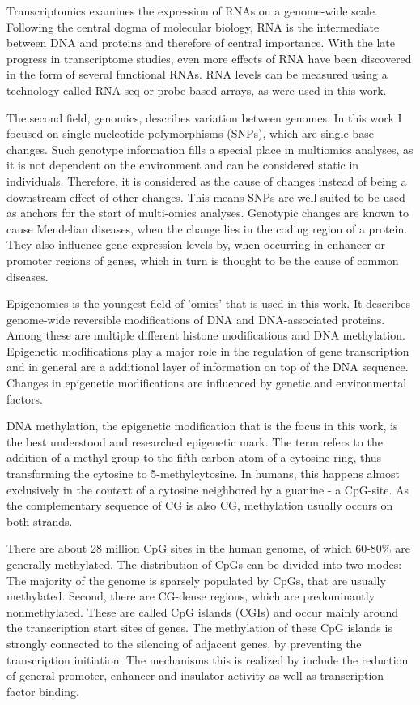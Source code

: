 \documentclass[a4paper,12pt,twoside,openright]{article}
\begin{document}
Transcriptomics examines the expression of RNAs on a genome-wide scale. Following the central dogma of molecular biology, RNA is the intermediate between DNA and proteins and therefore of central importance\cite{CRICK1970}. With the late progress in transcriptome studies, even more effects of RNA have been discovered in the form of several functional RNAs\cite{10.3389/fgene.2015.00002}. RNA levels can be measured using a technology called RNA-seq\cite{Wang2009} or probe-based arrays\cite{Schulze2001}, as were used in this work. 

The second field, genomics, describes variation between genomes. In this work I focused on single nucleotide polymorphisms (SNPs), which are single base changes.
Such genotype information fills a special place in multiomics analyses, as it is not dependent on the environment and can be considered static in individuals. Therefore, it is considered as the cause of changes instead of being a downstream effect of other changes\cite{Hasin2017}. This means SNPs are well suited to be used as anchors for the start of multi-omics analyses. 
Genotypic changes are known to cause Mendelian diseases, when the change lies in the coding region of a protein. They also influence gene expression levels by, when occurring in enhancer or promoter regions of genes, which in turn is thought to be the cause of common diseases\cite{Hasin2017}.

Epigenomics is the youngest field of 'omics' that is used in this work. It describes genome-wide reversible modifications of DNA and DNA-associated proteins. Among these are multiple different histone modifications and DNA methylation. Epigenetic modifications play a major role in the regulation of gene transcription\cite{Piuntiaad9780,Deaton2011} and in general are a additional layer of information on top of the DNA sequence. Changes in epigenetic modifications are influenced by genetic and environmental factors\cite{Hasin2017}.

DNA methylation, the epigenetic modification that is the focus in this work, is the best understood and researched epigenetic mark\cite{Smith2013}. The term refers to the addition of a methyl group to the fifth carbon atom of a cytosine ring, thus transforming the cytosine to 5-methylcytosine. In humans, this happens almost exclusively in the context of a cytosine neighbored by a guanine - a CpG-site. As the complementary sequence of CG is also CG, methylation usually occurs on both strands. 

There are about 28 million CpG sites in the human genome, of which 60-80\% are generally methylated\cite{Smith2013}. The distribution of CpGs can be divided into two modes: The majority of the genome is sparsely populated by CpGs, that are usually methylated. Second, there are CG-dense regions, which are predominantly nonmethylated. These are called CpG islands (CGIs) and occur mainly around the transcription start sites of genes\cite{Deaton2011}. The methylation of these CpG islands is strongly connected to the silencing of adjacent genes, by preventing the transcription initiation\cite{Deaton2011}. The mechanisms this is realized by include the reduction of general promoter, enhancer and insulator activity as well as transcription factor binding\cite{Smith2013}. 
\end{document}
